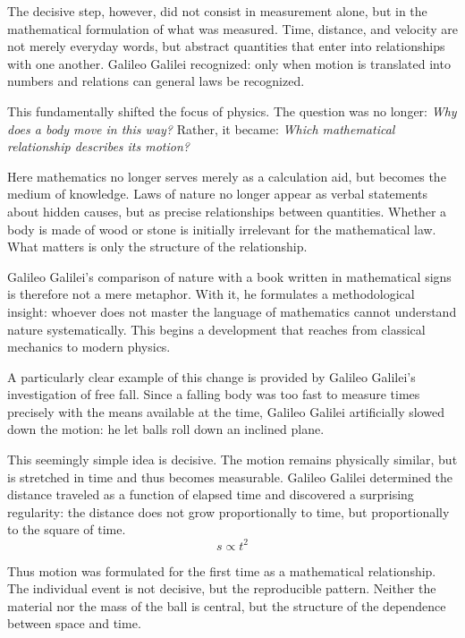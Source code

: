 The decisive step, however, did not consist in measurement alone,
but in the mathematical formulation of what was measured.
Time, distance, and velocity
are not merely everyday words,
but abstract quantities
that enter into relationships with one another.
Galileo Galilei recognized:
only when motion is translated into numbers and relations
can general laws be recognized.

This fundamentally shifted the focus of physics.
The question was no longer:
\emph{Why does a body move in this way?}
Rather, it became:
\emph{Which mathematical relationship describes its motion?}

Here mathematics no longer serves merely as a calculation aid,
but becomes the medium of knowledge.
Laws of nature
no longer appear as verbal statements about hidden causes,
but as precise relationships between quantities.
Whether a body is made of wood or stone
is initially irrelevant for the mathematical law.
What matters is only the structure of the relationship.

Galileo Galilei's comparison of nature with a book
written in mathematical signs is therefore not a mere metaphor.
With it, he formulates a methodological insight:
whoever does not master the language of mathematics
cannot understand nature systematically.
This begins a development
that reaches from classical mechanics
to modern physics.

A particularly clear example of this change
is provided by Galileo Galilei's investigation of free fall.
Since a falling body was too fast
to measure times precisely with the means available at the time,
Galileo Galilei artificially slowed down the motion:
he let balls roll down an inclined plane.

This seemingly simple idea is decisive.
The motion remains physically similar,
but is stretched in time and thus becomes measurable.
Galileo Galilei determined the distance traveled
as a function of elapsed time
and discovered a surprising regularity:
the distance does not grow proportionally to time,
but proportionally to the square of time.
\[
s \propto t^{2}
\]

Thus motion was formulated for the first time
as a mathematical relationship.
The individual event is not decisive,
but the reproducible pattern.
Neither the material nor the mass of the ball is central,
but the structure of the dependence between space and time.

